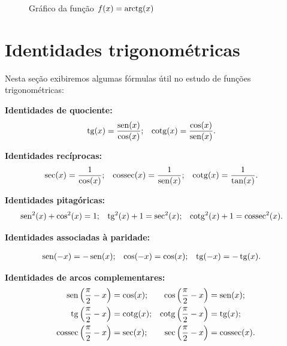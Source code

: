 \begin{itemize}
  \begin{figure}[H]
  \centering
    \caption{Gráfico da função $f(x)= \operatorname{arctg}(x)$}
  \end{figure}


  \end{itemize}

\section{Identidades trigonométricas}

 Nesta seção exibiremos algumas fórmulas útil no estudo de funções trigonométricas:
 
\vspace{.5cm}
 \textbf{Identidades de quociente:}
\begin{align*}
\operatorname{tg}(x) &= \dfrac{\operatorname{sen}(x)}{\cos(x)}; & \operatorname{cotg}(x) &= \dfrac{\cos(x)}{\operatorname{sen}(x)}.
\end{align*}

 \textbf{Identidades recíprocas:}
\begin{align*}
\sec(x) &= \dfrac{1}{\cos(x)}; &
   \operatorname{cossec}(x)&= \dfrac{1}{\operatorname{sen}(x)}; &
   \operatorname{cotg}(x)&= \dfrac{1}{\tan(x)}.  
\end{align*}

 \textbf{Identidades pitagóricas:}
\begin{align*}
    \operatorname{sen}^2(x) + \cos^2(x) &= 1; &
   \operatorname{tg}^2(x)+ 1 &= \sec^2(x); &
   \operatorname{cotg}^2(x)+1 &=\operatorname{cossec}^2(x).
\end{align*}

 \textbf{Identidades associadas à paridade:}

\begin{align*}
\operatorname{sen}(-x)&= -\operatorname{sen}(x);
& \cos(-x)&= \cos(x);&
\operatorname{tg}(-x)&=-\operatorname{tg}(x).
\end{align*}

 \textbf{Identidades de arcos complementares:}
\begin{align*}
    \operatorname{sen} \left(\frac{\pi}{2} - x \right) &= \cos(x); & \cos \left(\frac{\pi}{2} - x \right) &= \operatorname{sen}(x); \\
    \operatorname{tg} \left(\frac{\pi}{2} - x \right) &= \operatorname{cotg}(x); &
    \operatorname{cotg} \left(\frac{\pi}{2} - x \right) &= \operatorname{tg}(x);\\
    \operatorname{cossec} \left(\frac{\pi}{2} - x \right) &= \sec(x); &
   \sec \left(\frac{\pi}{2} - x \right) &= \operatorname{cossec}(x).
\end{align*}

